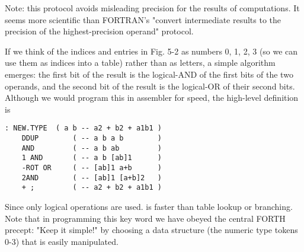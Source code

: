 \leftbar[1\linewidth]
Note: this protocol avoids misleading precision for the results of computations. It seems more scientific than FORTRAN's "convert intermediate results to the precision of the highest-precision operand" protocol.
\endleftbar

If we think of the indices and entries in Fig. 5-2 as numbers 0, 1, 2, 3 (so we can use them as indices into a table) rather than as letters, a simple algorithm emerges: the first bit of the result is the logical-AND of the first bits of the two operands, and the second bit of the result is the logical-OR of their second bits. Although we would program this in assembler for speed, the high-level definition is

\begin{lstlisting}
: NEW.TYPE  ( a b -- a2 + b2 + a1b1 )
    DDUP        ( -- a b a b        )
    AND         ( -- a b ab         )
    1 AND       ( -- a b [ab]1      )
    -ROT OR     ( -- [ab]1 a+b      )
    2AND        ( -- [ab]1 [a+b]2   )
    + ;         ( -- a2 + b2 + a1b1 )
\end{lstlisting}

Since only logical operations are used.  is faster than table lookup or branching. Note that in programming this key word we have obeyed the central FORTH precept: "Keep it simple!" by choosing a data structure (the numeric type tokens 0-3) that is easily manipulated.

